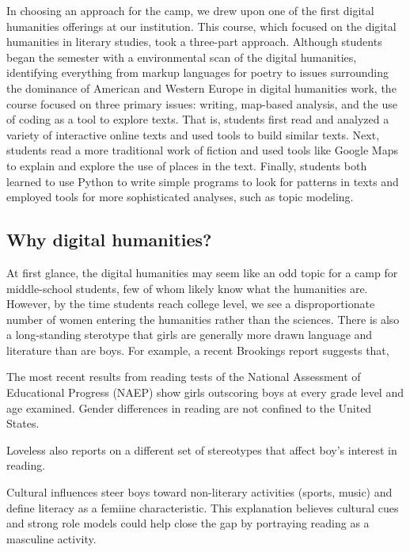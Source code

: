 In choosing an approach for the camp, we drew upon one of the first
digital humanities offerings at our institution.  This course, which
focused on the digital humanities in literary studies, took a
three-part approach.  Although students began the semester with a
environmental scan of the digital humanities, identifying everything
from markup languages for poetry to issues surrounding the dominance
of American and Western Europe in digital humanities work, the
course focused on three primary issues: writing, map-based analysis,
and the use of coding as a tool to explore texts.  That is, students
first read and analyzed a variety of interactive online texts and
used tools to build similar texts.  Next, students read a more
traditional work of fiction and used tools like Google Maps to
explain and explore the use of places in the text.  Finally, students
both learned to use Python to write simple programs to look for
patterns in texts and employed tools for more sophisticated analyses,
such as topic modeling.

\subsection{Why digital humanities?}

At first glance, the digital humanities may seem like an odd topic
for a camp for middle-school students, few of whom likely know what
the humanities are.  However, by the time students reach college
level, we see a disproportionate number of women entering the
humanities rather than the sciences.  There is also a long-standing
sterotype that girls are generally more drawn language and literature
than are boys.  For example, a recent Brookings report \cite{Loveless2015}
suggests that,
\begin{blockquote}
The most recent results from reading tests of the National Assessment of Educational Progress (NAEP) show girls outscoring boys at every grade level and age examined. Gender differences in reading are not confined to the United States.
\end{blockquote}

Loveless also reports on a different set of stereotypes that affect
boy's interest in reading.  
\begin{blockquote}
Cultural influences steer boys
toward non-literary activities (sports, music) and define literacy
as a femiine characteristic. This explanation believes cultural
cues and strong role models could help close the gap by portraying
reading as a masculine activity.
\end{blockquote}

